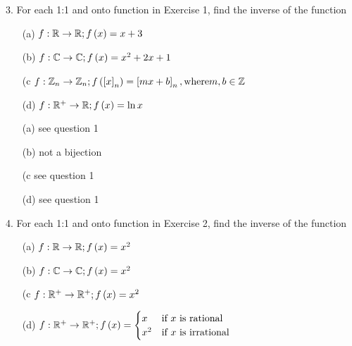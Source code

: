  \newpage
\begin{mdframed}[style=darkQuesion]
  3.   For each 1:1 and onto function in Exercise 1, find the inverse of the 
  function
\begin{itemize}
  \item [(a)]{
    $f:\mathbb{R}\to \mathbb{R}; f\left(x\right)=x+3$
  }
  \item [(b)]{
    $f:\mathbb{C}\to \mathbb{C}; f\left(x\right)=x^2+2x+1$
  }
  \item [(c]{
    $f:\mathbb{Z}_n\to \mathbb{Z}_n; f\left(\left[x\right]_n\right)=\left[mx+b\right]_n, \text{where} m,b\in \mathbb{Z}$
  }
  \item [(d)]{
    $f:\mathbb{R}^+\to \mathbb{R}; f\left(x\right)=\ln x$
  }
\end{itemize}
\end{mdframed}

\begin{mdframed}[style=darkAnswer,frametitle={Joe Starr}]
  \begin{multicols}{2}
    \begin{itemize}
    \item [(a)]{
        see question 1
    }
    \item [(b)]{
      not a bijection
    }
    \item [(c]{
      see question 1
      }
      \item [(d)]{
      see question 1
      }
    \end{itemize}
  \end{multicols}
  \end{mdframed}
\newpage
\begin{mdframed}[style=darkQuesion]
  4.   For each 1:1 and onto function in Exercise 2, find the inverse of the 
  function
\begin{itemize}
  \item [(a)]{
    $f:\mathbb{R}\to \mathbb{R}; f\left(x\right)=x^2$
  }
  \item [(b)]{
    $f:\mathbb{C}\to \mathbb{C}; f\left(x\right)=x^2$
  }
  \item [(c]{
    $f:\mathbb{R}^+\to \mathbb{R}^+; f\left(x\right)=x^2$
  }
  \item [(d)]{
    $f:\mathbb{R}^+\to \mathbb{R}^+; f\left(x\right)=
    \begin{cases}
      x &\text{if }x\text{ is rational}\\
      x^2 &\text{if }x\text{ is irrational}\\
    \end{cases}$
  }
\end{itemize}
\end{mdframed}

